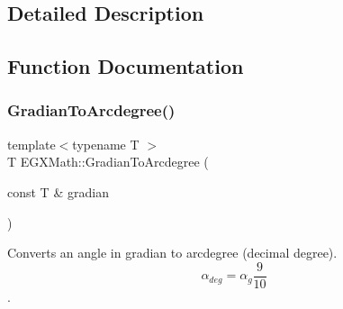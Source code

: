 \subsection{Detailed Description}


\subsection{Function Documentation}
\mbox{\label{group___e_g_x_math-_angle_conversions-_gradian_gacd0b1797f2460944dcbc541a855ec21c}} 
\subsubsection{\texorpdfstring{Gradian\+To\+Arcdegree()}{GradianToArcdegree()}}
{\footnotesize\ttfamily template$<$typename T $>$ \\
T E\+G\+X\+Math\+::\+Gradian\+To\+Arcdegree (\begin{DoxyParamCaption}\item[{const T \&}]{gradian }\end{DoxyParamCaption})}



Converts an angle in gradian to arcdegree (decimal degree). \[\alpha_{deg}=\alpha_{g}\frac{9}{10}\]. 

